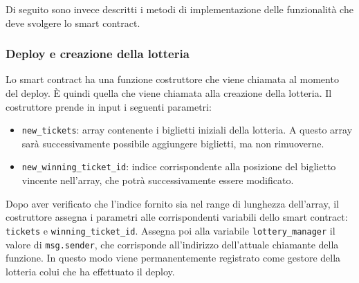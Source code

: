 \documentclass[12pt,a4paper,openright,twoside]{report}
\begin{document}
Di seguito sono invece descritti i metodi di implementazione delle funzionalità che deve svolgere lo smart contract.

\subsubsection{Deploy e creazione della lotteria}
Lo smart contract ha una funzione costruttore che viene chiamata al momento del deploy. È quindi quella che viene chiamata alla creazione della lotteria. Il costruttore prende in input i seguenti parametri:
\begin{itemize}
    \item \texttt{new\_tickets}: array contenente i biglietti iniziali della lotteria. A questo array sarà successivamente possibile aggiungere biglietti, ma non rimuoverne.
    \item \texttt{new\_winning\_ticket\_id}: indice corrispondente alla posizione del biglietto vincente nell'array, che potrà successivamente essere modificato.
\end{itemize}
Dopo aver verificato che l'indice fornito sia nel range di lunghezza dell'array, il costruttore assegna i parametri alle corrispondenti variabili dello smart contract: \texttt{tickets} e \texttt{winning\_ticket\_id}. Assegna poi alla variabile \texttt{lottery\_manager} il valore di \texttt{msg.sender}, che corrisponde all'indirizzo dell'attuale chiamante della funzione. In questo modo viene permanentemente registrato come gestore della lotteria colui che ha effettuato il deploy.
\end{document}
